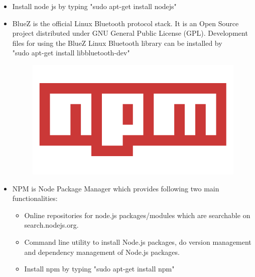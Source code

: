 \documentclass[11pt,a4paper]{article}
\begin{document}
\begin{itemize}
	 \item Install node js by typing "sudo apt-get install nodejs"

	 \item BlueZ is the official Linux Bluetooth protocol stack. It is an Open Source project distributed under GNU General Public License (GPL).
	 Development files for using the BlueZ Linux Bluetooth library can be installed by\\ "sudo apt-get install libbluetooth-dev"
	 \newpage
	 \begin{figure}[h]
    \centering
	\includegraphics[scale=0.3]{npm-logo.png}
	\end{figure}
	
	\item NPM is Node Package Manager which provides following two main functionalities:
	\begin{itemize}
	\item  Online repositories for node.js packages/modules which are searchable on search.nodejs.org.
	\item  Command line utility to install Node.js packages, do version management and dependency management of Node.js packages.
	\item Install npm by typing "sudo apt-get install npm"
	\end{itemize}
	

\end{itemize}
\end{document}
